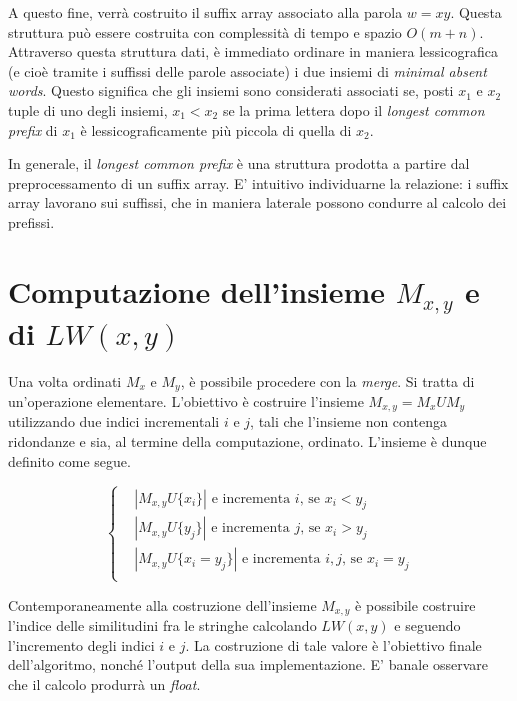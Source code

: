 \vspace{3mm}

A questo fine, verrà costruito il suffix array associato alla parola $w=xy$. Questa struttura può essere costruita con complessità di tempo e spazio $O(m+n)$. Attraverso questa struttura dati, è immediato ordinare in maniera lessicografica (e cioè tramite i suffissi delle parole associate) i due insiemi di \textit{minimal absent words}. 
Questo significa che gli insiemi sono considerati associati se, posti $x_1$ e $x_2$ tuple di uno degli insiemi, $x_1 < x_2$ se la prima lettera dopo il \textit{longest common prefix} di $x_1$ è lessicograficamente più piccola di quella di $x_2$. 

In generale, il \textit{longest common prefix} è una struttura prodotta a partire dal preprocessamento di un suffix array. E' intuitivo individuarne la relazione: i suffix array lavorano sui suffissi, che in maniera laterale possono condurre al calcolo dei prefissi.

\section{Computazione dell'insieme \(M_{x,y}\) e di \(LW(x,y)\)}

Una volta ordinati $M_x$ e $M_y$, è possibile procedere con la \textit{merge}. Si tratta di un'operazione elementare. L'obiettivo è costruire l'insieme $M_{x,y} = M_x U M_y$ utilizzando due indici incrementali $i$ e $j$, tali che l'insieme non contenga ridondanze e sia, al termine della computazione, ordinato. L'insieme è dunque definito come segue.

\begin{equation*}
  \left\{
    \begin{aligned}
      & {\left|
        M_{x,y} U \{x_i \}
      \right|} \text{ e incrementa } i\text{, se } x_i < y_j \\
      & {\left|
        M_{x,y} U \{y_j \}
      \right|} \text{ e incrementa } j\text{, se } x_i > y_j \\
      & {\left|
        M_{x,y} U \{x_i = y_j \}
      \right|} \text{ e incrementa } i,j\text{, se } x_i = y_j \\
    \end{aligned}
  \right.
\end{equation*}

Contemporaneamente alla costruzione dell'insieme $M_{x,y}$ è possibile costruire l'indice delle similitudini fra le stringhe calcolando $LW(x,y)$ e seguendo l'incremento degli indici $i$ e $j$. La costruzione di tale valore è l'obiettivo finale dell'algoritmo, nonché l'output della sua implementazione. E' banale osservare che il calcolo produrrà un \textit{float}.

